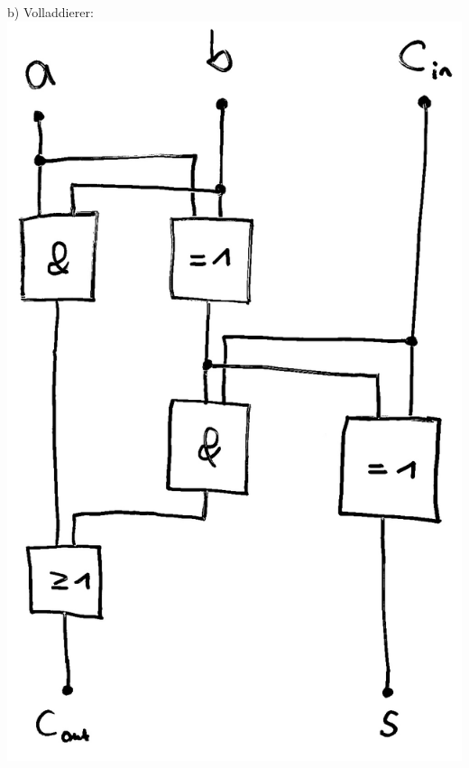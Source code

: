 \documentclass{article}
\begin{document}
	\begin{minipage}[t]{0.3\linewidth}
		b) Volladdierer:\\
		\hspace{1em}\includegraphics[width=0.8\linewidth]{fulladder.jpeg} 
	\end{minipage}
\end{document}
